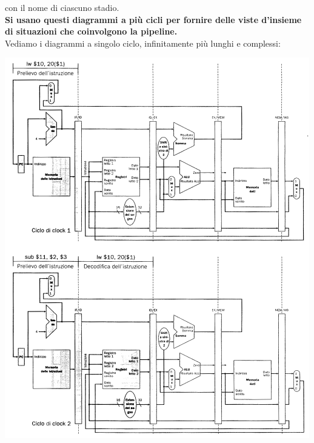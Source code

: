 \documentclass[a4paper,12pt, oneside]{book}
\begin{document}
con il nome di ciascuno stadio.\\
\textbf{Si usano questi diagrammi a più cicli per fornire delle
  viste d'insieme di situazioni che coinvolgono la pipeline.}\\
\newpage
Vediamo i diagrammi a singolo ciclo, infinitamente più lunghi e complessi:
\begin{center}
  \includegraphics[scale = 0.7]{img/piper3.png}
\end{center}
\end{document}

